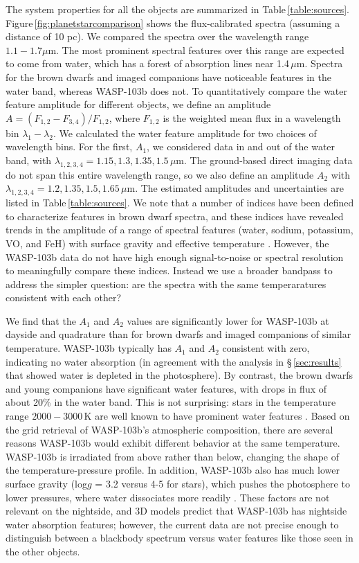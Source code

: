 \documentclass[twocolumn, trackchanges]{aastex61}
\begin{document}
The system properties for all the objects are summarized in Table\,\ref{table:sources}.  Figure\,\ref{fig:planetstarcomparison} shows the flux-calibrated spectra (assuming a distance of 10 pc).  We compared the spectra over the wavelength range $1.1 - 1.7\mu$m. The most prominent spectral features over this range are expected to come from water, which has a forest of absorption lines near 1.4\,$\mu$m. Spectra for the brown dwarfs and imaged companions have noticeable features in the water band, whereas WASP-103b does not. To quantitatively compare the water feature amplitude for different objects, we define an amplitude $A = (F_{1,2} - F_{3,4})/F_{1,2}$, where $F_{1,2}$ is the weighted mean flux in a wavelength bin $\lambda_1 - \lambda_2$. We calculated the water feature amplitude for two choices of wavelength bins. For the first, $A_1$, we considered data in and out of the water band, with $\lambda_{1,2,3,4} = 1.15, 1.3, 1.35, 1.5\,\mu$m. The ground-based direct imaging data do not span this entire wavelength range, so we also define an amplitude $A_2$ with $\lambda_{1,2,3,4} = 1.2, 1.35, 1.5, 1.65\,\mu$m. The estimated amplitudes and uncertainties are listed in Table\,\ref{table:sources}. We note that a number of indices have been defined to characterize features in brown dwarf spectra, and these indices have revealed trends in the amplitude of a range of spectral features (water, sodium, potassium, VO, and FeH) with surface gravity and effective temperature \citep{reid01,geballe02,mclean03}. However, the WASP-103b data do not have high enough signal-to-noise or spectral resolution to meaningfully compare these indices. Instead we use a broader bandpass to address the simpler question: are the spectra with the same temperaratures consistent with each other?
 
We find that the $A_1$ and $A_2$ values are significantly lower for WASP-103b at dayside and quadrature than for brown dwarfs and imaged companions of similar temperature. WASP-103b typically has $A_1$ and $A_2$ consistent with zero, indicating no water absorption (in agreement with the analysis in \S\,\ref{sec:results} that showed water is depleted in the photosphere). By contrast, the brown dwarfs and young companions have significant water features, with drops in flux of about 20\% in the water band. This is not surprising: stars in the temperature range $2000 - 3000\,\mathrm{K}$ are well known to have prominent water features \citep{kirkpatrick93}.  Based on the grid retrieval of WASP-103b's atmospheric composition, there are several reasons WASP-103b would exhibit different behavior at the same temperature. WASP-103b is irradiated from above rather than below, changing the shape of the temperature-pressure profile. In addition, WASP-103b also has much lower surface gravity (log$g$ = 3.2 versus 4-5 for stars), which pushes the photosphere to lower pressures, where water dissociates more readily \citep{arcangeli18}. These factors are not relevant on the nightside, and 3D models predict that WASP-103b has nightside water absorption features; however, the current data are not precise enough to distinguish between a blackbody spectrum versus water features like those seen in the other objects. 
\end{document}
